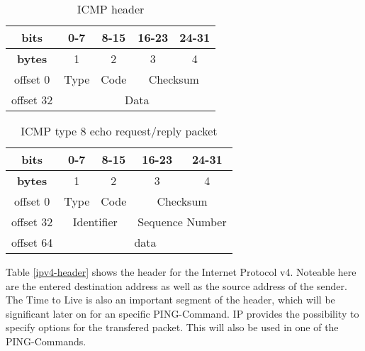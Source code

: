 \begin{table}[]
	\centering
	\label{abstract-icmp-header}
	\begin{tabular}{|c|c|c|c|c|}
		\hline
		\textbf{bits}  & 0-7  & 8-15 & 16-23         & 24-31         \\ \hline
		\textbf{bytes} & 1    & 2    & 3             & 4             \\ \hline
		offset 0       & Type & Code & \multicolumn{2}{c|}{Checksum} \\ \hline
		offset 32      & \multicolumn{4}{c|}{Data}                   \\ \hline
	\end{tabular}
	\caption{ICMP header}
\end{table}

\begin{table}[]
	\centering
	\label{icmp-echo-request-header}
	\begin{tabular}{|c|c|c|c|c|}
		\hline
		\textbf{bits}                   & 0-7            & 8-15           & 16-23             & 24-31            \\ \hline
		\textbf{bytes}                  & 1              & 2              & 3                 & 4                \\ \hline
		offset 0                        & Type           & Code           & \multicolumn{2}{c|}{Checksum}        \\ \hline
		\multicolumn{1}{|l|}{offset 32} & \multicolumn{2}{c|}{Identifier} & \multicolumn{2}{c|}{Sequence Number} \\ \hline
		offset 64                       & \multicolumn{4}{c|}{data}                                              \\ \hline
	\end{tabular}
	\caption{ICMP type 8 echo request/reply packet }
	
\end{table}

Table \ref{ipv4-header} shows the header for the Internet Protocol v4. Noteable here are the entered destination address as well as the source address of the sender. The Time to Live is also an important segment of the header, which will be significant later on for an specific PING-Command. IP provides the possibility to specify options for the transfered packet. This will also be used in one of the PING-Commands.

